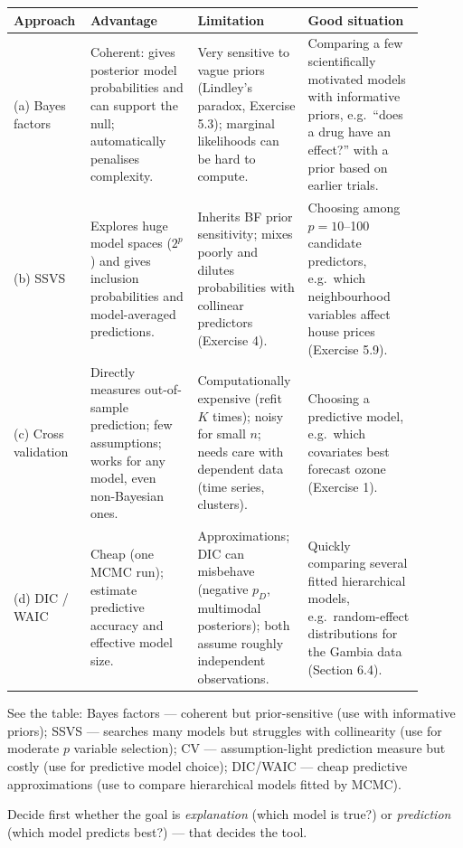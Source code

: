 \documentclass[11pt]{article}
\begin{document}
\solution
\begin{center}
\small
\renewcommand{\arraystretch}{1.35}
\begin{tabular}{p{0.13\linewidth}p{0.25\linewidth}p{0.25\linewidth}p{0.27\linewidth}}\toprule
Approach & Advantage & Limitation & Good situation\\\midrule
(a) Bayes factors & Coherent: gives posterior model probabilities and can support the null; automatically penalises complexity. & Very sensitive to vague priors (Lindley's paradox, Exercise 5.3); marginal likelihoods can be hard to compute. & Comparing a few scientifically motivated models with informative priors, e.g.\ ``does a drug have an effect?'' with a prior based on earlier trials.\\
(b) SSVS & Explores huge model spaces ($2^p$) and gives inclusion probabilities and model-averaged predictions. & Inherits BF prior sensitivity; mixes poorly and dilutes probabilities with collinear predictors (Exercise 4). & Choosing among $p=10$--100 candidate predictors, e.g.\ which neighbourhood variables affect house prices (Exercise 5.9).\\
(c) Cross validation & Directly measures out-of-sample prediction; few assumptions; works for any model, even non-Bayesian ones. & Computationally expensive (refit $K$ times); noisy for small $n$; needs care with dependent data (time series, clusters). & Choosing a predictive model, e.g.\ which covariates best forecast ozone (Exercise 1).\\
(d) DIC / WAIC & Cheap (one MCMC run); estimate predictive accuracy and effective model size. & Approximations; DIC can misbehave (negative $p_D$, multimodal posteriors); both assume roughly independent observations. & Quickly comparing several fitted hierarchical models, e.g.\ random-effect distributions for the Gambia data (Section 6.4).\\\bottomrule
\end{tabular}
\end{center}

\begin{answer}
See the table: Bayes factors --- coherent but prior-sensitive (use with informative priors); SSVS --- searches many models but struggles with collinearity (use for moderate $p$ variable selection); CV --- assumption-light prediction measure but costly (use for predictive model choice); DIC/WAIC --- cheap predictive approximations (use to compare hierarchical models fitted by MCMC).
\end{answer}

\begin{takeaway}
Decide first whether the goal is \emph{explanation} (which model is true?) or \emph{prediction} (which model predicts best?) --- that decides the tool.
\end{takeaway}
\end{document}
